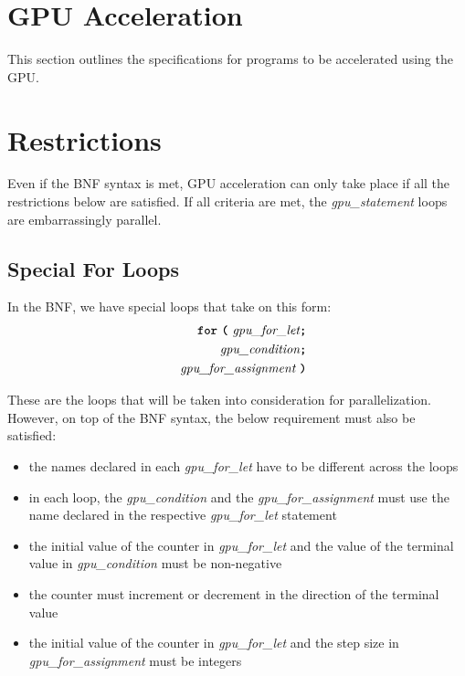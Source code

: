 





\newpage

\section*{GPU Acceleration}
\label{gpu_supp}
This section outlines the specifications for programs to be accelerated using the GPU.\


\newpage

\section*{Restrictions}

Even if the BNF syntax is met, GPU acceleration can only take place if all the restrictions below are satisfied. If all criteria are met, the \textit{gpu\_statement} loops are embarrassingly parallel.

\subsection*{Special For Loops}

In the BNF, we have special loops that take on this form:
\begin{alignat*}{9}
&& \textbf{\texttt{for}}\ \textbf{\texttt{(}} 
                          \ \textit{gpu\_for\_let} \textbf{\texttt{;}} \\
&& \ \ \textit{gpu\_condition} \textbf{\texttt{;}} \\
&& \textit{gpu\_for\_assignment} \ \textbf{\texttt{)}} 
\end{alignat*}

These are the loops that will be taken into consideration for parallelization. However, on top of the BNF syntax, the below requirement must also be satisfied:

\begin{itemize}
    \item{the names declared in each \textit{gpu\_for\_let} have to be different across the loops}
    \item{in each loop, the \textit{gpu\_condition} and the \textit{gpu\_for\_assignment} must use the name declared
    in the respective \textit{gpu\_for\_let} statement}
    \item{the initial value of the counter in  \textit{gpu\_for\_let} and the value of the terminal value in \textit{gpu\_condition} must be non-negative}
    \item{the counter must increment or decrement in the direction of the terminal value}
    \item{the initial value of the counter in \textit{gpu\_for\_let} and the step size in \textit{gpu\_for\_assignment} must be integers}
\end{itemize}

